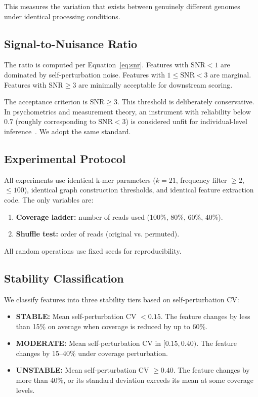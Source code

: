 \documentclass{../yalumba}
\begin{document}
This measures the variation that exists between genuinely different
genomes under identical processing conditions.

\subsection{Signal-to-Nuisance Ratio}

The ratio is computed per Equation~\ref{eq:snr}.  Features with
$\text{SNR} < 1$ are dominated by self-perturbation noise.  Features
with $1 \leq \text{SNR} < 3$ are marginal.  Features with
$\text{SNR} \geq 3$ are minimally acceptable for downstream scoring.

\begin{keyfinding}
The acceptance criterion is $\text{SNR} \geq 3$.  This threshold is
deliberately conservative.  In psychometrics and measurement theory,
an instrument with reliability below 0.7 (roughly corresponding to
$\text{SNR} < 3$) is considered unfit for individual-level
inference~\cite{hennig2007cluster}.  We adopt the same standard.
\end{keyfinding}

\subsection{Experimental Protocol}

All experiments use identical k-mer parameters ($k = 21$, frequency
filter $\geq 2$, $\leq 100$), identical graph construction thresholds,
and identical feature extraction code.  The only variables are:

\begin{enumerate}
  \item \textbf{Coverage ladder:} number of reads used (100\%, 80\%,
    60\%, 40\%).
  \item \textbf{Shuffle test:} order of reads (original vs. permuted).
\end{enumerate}

All random operations use fixed seeds for reproducibility.

\subsection{Stability Classification}

We classify features into three stability tiers based on self-perturbation
CV:

\begin{definition}
\begin{itemize}
  \item \textbf{STABLE:} Mean self-perturbation CV $< 0.15$.  The
    feature changes by less than 15\% on average when coverage is reduced
    by up to 60\%.
  \item \textbf{MODERATE:} Mean self-perturbation CV in $[0.15, 0.40)$.
    The feature changes by 15--40\% under coverage perturbation.
  \item \textbf{UNSTABLE:} Mean self-perturbation CV $\geq 0.40$.  The
    feature changes by more than 40\%, or its standard deviation exceeds
    its mean at some coverage levels.
\end{itemize}
\end{definition}
\end{document}

